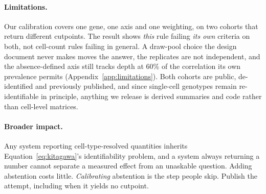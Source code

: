 \paragraph{Limitations.} Our calibration covers one gene, one axis and one
weighting, on two cohorts that return different cutpoints. The result shows
\emph{this} rule failing \emph{its own} criteria on both, not cell-count rules
failing in general. A draw-pool choice the
design document never makes moves the answer, the replicates are not
independent, and the absence-defined axis still tracks depth at 60\% of the
correlation its own prevalence permits (Appendix~\ref{app:limitations}). Both
cohorts are public, de-identified and previously published, and since single-cell
genotypes remain re-identifiable in principle, anything we release is derived
summaries and code rather than cell-level matrices.

\paragraph{Broader impact.} Any system reporting cell-type-resolved quantities
inherits Equation~\ref{eq:kitagawa}'s identifiability problem, and a system
always returning a number cannot separate a measured effect from an unaskable
question. Adding abstention costs little. \emph{Calibrating} abstention is the
step people skip.\iffull{} Publish the attempt, including when it yields no
cutpoint.\fi
